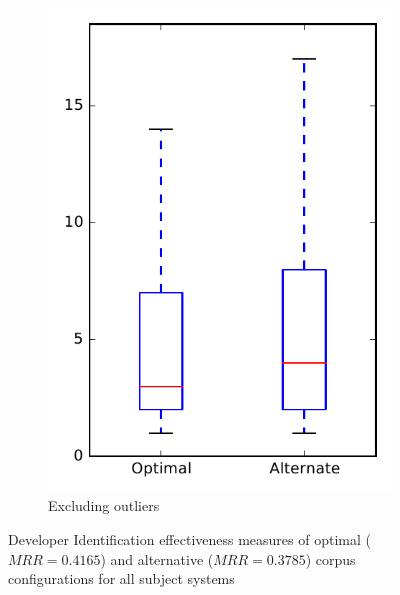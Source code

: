 \begin{figure}
\begin{subfigure}{.4\textwidth}
        \includegraphics[height=0.4\textheight]{figures/combo/dit_rq2_all_no_outlier}
        \caption{Excluding outliers}\label{fig:combo:dit:rq2:all_no_outlier}
    \end{subfigure}
\caption[Developer Identification effectiveness measures of optimal and alternative corpus configurations for all subject systems]%
{Developer Identification effectiveness measures of optimal ($MRR=0.4165$) and alternative ($MRR=0.3785$) corpus configurations for all subject systems}
\label{fig:combo:dit:rq2:all}
\end{figure}
